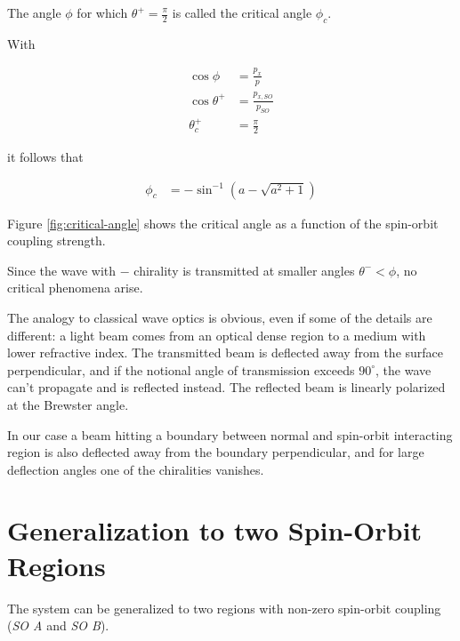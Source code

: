 The angle $\phi$ for which $\theta^+ =\frac{\pi}{2}$ is called the
critical angle $\phi_c$.

\clearpage
With

\begin{align}
    \cos \phi       &= \frac{p_x}{p}\\
    \cos \theta^+   &= \frac{p_{x,SO}}{p_{SO}}\\
    \theta_c^+      &= \frac{\pi}{2}
\end{align}

it follows that

\begin{align}
    \phi_c          &= -\sin ^{-1}\left(a-\sqrt{a^2+1}\right)
\end{align}

Figure \ref{fig:critical-angle} shows the critical angle as a function
of the spin-orbit coupling strength.

Since the wave with $-$ chirality is transmitted at smaller angles
$\theta^- < \phi$, no critical phenomena arise.

The analogy to classical wave optics is obvious, even if some of the
details are different: a light beam comes from an optical dense
region to a medium with lower refractive index. The transmitted beam
is deflected away from the surface perpendicular, and if the notional
angle of transmission
exceeds $90^\circ$, the wave can't propagate and is reflected instead.
The reflected beam is linearly polarized at the Brewster angle.

In our case a beam hitting a boundary between normal and spin-orbit
interacting region is also deflected away from the boundary
perpendicular, and for large deflection angles one of the chiralities
vanishes.

\section{Generalization to two Spin-Orbit Regions}

The system can be generalized to two regions with non-zero spin-orbit
coupling (\emph{SO A} and \emph{SO B}).

